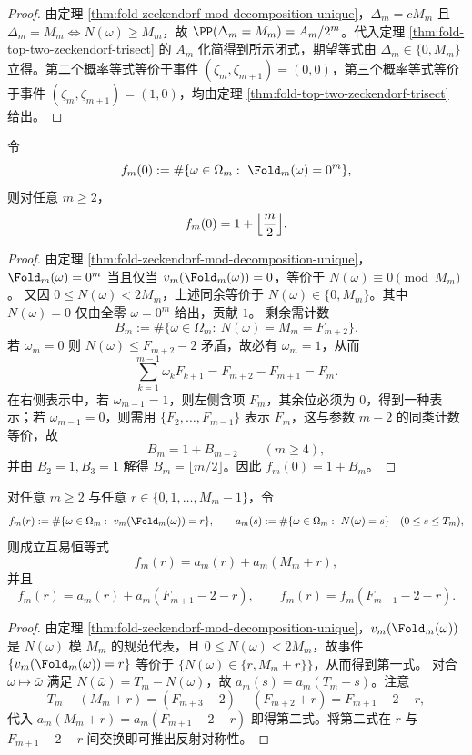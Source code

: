 \begin{proof}
由定理 \ref{thm:fold-zeckendorf-mod-decomposition-unique}，$\Delta_m=cM_m$ 且 $\Delta_m=M_m\iff N(\omega)\ge M_m$，故 $\PP(\Delta_m=M_m)=A_m/2^m$。代入定理 \ref{thm:fold-top-two-zeckendorf-trisect} 的 $A_m$ 化简得到所示闭式，期望等式由 $\Delta_m\in\{0,M_m\}$ 立得。第二个概率等式等价于事件 $(\zeta_m,\zeta_{m+1})=(0,0)$，第三个概率等式等价于事件 $(\zeta_m,\zeta_{m+1})=(1,0)$，均由定理 \ref{thm:fold-top-two-zeckendorf-trisect} 给出。
\end{proof}

\begin{proposition}[零剩余纤维的线性退化]\label{prop:fold-zero-fiber-linear}
令
\[
f_m(0):=\#\{\omega\in\Omega_m:\ \Fold_m(\omega)=0^m\},
\]
则对任意 $m\ge 2$，
\[
f_m(0)=1+\Bigl\lfloor\frac{m}{2}\Bigr\rfloor.
\]
\end{proposition}

\begin{proof}
由定理 \ref{thm:fold-zeckendorf-mod-decomposition-unique}，$\Fold_m(\omega)=0^m$ 当且仅当 $v_m(\Fold_m(\omega))=0$，等价于 $N(\omega)\equiv 0\pmod{M_m}$。
又因 $0\le N(\omega)<2M_m$，上述同余等价于 $N(\omega)\in\{0,M_m\}$。其中 $N(\omega)=0$ 仅由全零 $\omega=0^m$ 给出，贡献 $1$。
剩余需计数
\[
B_m:=\#\{\omega\in\Omega_m:\ N(\omega)=M_m=F_{m+2}\}.
\]
若 $\omega_m=0$ 则 $N(\omega)\le F_{m+2}-2$ 矛盾，故必有 $\omega_m=1$，从而
\[
\sum_{k=1}^{m-1}\omega_kF_{k+1}=F_{m+2}-F_{m+1}=F_m.
\]
在右侧表示中，若 $\omega_{m-1}=1$，则左侧含项 $F_m$，其余位必须为 $0$，得到一种表示；若 $\omega_{m-1}=0$，则需用 $\{F_2,\dots,F_{m-1}\}$ 表示 $F_m$，这与参数 $m-2$ 的同类计数等价，故
\[
B_m=1+B_{m-2}\qquad(m\ge 4),
\]
并由 $B_2=1,B_3=1$ 解得 $B_m=\lfloor m/2\rfloor$。因此 $f_m(0)=1+B_m$。
\end{proof}

\begin{proposition}[纤维计数的互易律与反射对称性]\label{prop:fold-fiber-count-reciprocity}
对任意 $m\ge 2$ 与任意 $r\in\{0,1,\dots,M_m-1\}$，令
\[
f_m(r):=\#\{\omega\in\Omega_m:\ v_m(\Fold_m(\omega))=r\},
\qquad
a_m(s):=\#\{\omega\in\Omega_m:\ N(\omega)=s\}\quad(0\le s\le T_m),
\]
则成立互易恒等式
\[
f_m(r)=a_m(r)+a_m(M_m+r),
\]
并且
\[
f_m(r)=a_m(r)+a_m(F_{m+1}-2-r),
\qquad
f_m(r)=f_m(F_{m+1}-2-r).
\]
\end{proposition}

\begin{proof}
由定理 \ref{thm:fold-zeckendorf-mod-decomposition-unique}，$v_m(\Fold_m(\omega))$ 是 $N(\omega)$ 模 $M_m$ 的规范代表，且 $0\le N(\omega)<2M_m$，故事件 $\{v_m(\Fold_m(\omega))=r\}$ 等价于 $\{N(\omega)\in\{r,M_m+r\}\}$，从而得到第一式。
对合 $\omega\mapsto\bar\omega$ 满足 $N(\bar\omega)=T_m-N(\omega)$，故 $a_m(s)=a_m(T_m-s)$。注意
\[
T_m-(M_m+r)=(F_{m+3}-2)-(F_{m+2}+r)=F_{m+1}-2-r,
\]
代入 $a_m(M_m+r)=a_m(F_{m+1}-2-r)$ 即得第二式。将第二式在 $r$ 与 $F_{m+1}-2-r$ 间交换即可推出反射对称性。
\end{proof}

